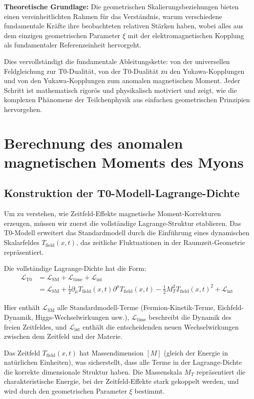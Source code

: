 \documentclass[12pt,a4paper]{article}
\newcommand{\Tfield}{T_{\text{field}}(x,t)}
\newcommand{\xigeom}{\xi}
\begin{document}
	\textbf{Theoretische Grundlage:} Die geometrischen Skalierungsbeziehungen bieten einen vereinheitlichten Rahmen für das Verständnis, warum verschiedene fundamentale Kräfte ihre beobachteten relativen Stärken haben, wobei alles aus dem einzigen geometrischen Parameter $\xigeom$ mit der elektromagnetischen Kopplung als fundamentaler Referenzeinheit hervorgeht.
	
	Dies vervollständigt die fundamentale Ableitungskette: von der universellen Feldgleichung zur T0-Dualität, von der T0-Dualität zu den Yukawa-Kopplungen und von den Yukawa-Kopplungen zum anomalen magnetischen Moment. Jeder Schritt ist mathematisch rigorös und physikalisch motiviert und zeigt, wie die komplexen Phänomene der Teilchenphysik aus einfachen geometrischen Prinzipien hervorgehen.
	
	\section{Berechnung des anomalen magnetischen Moments des Myons}
	
	\subsection{Konstruktion der T0-Modell-Lagrange-Dichte}
	
	Um zu verstehen, wie Zeitfeld-Effekte magnetische Moment-Korrekturen erzeugen, müssen wir zuerst die vollständige Lagrange-Struktur etablieren. Das T0-Modell erweitert das Standardmodell durch die Einführung eines dynamischen Skalarfeldes $\Tfield$, das zeitliche Fluktuationen in der Raumzeit-Geometrie repräsentiert.
	
	Die vollständige Lagrange-Dichte hat die Form:
	\begin{align}
		\mathcal{L}_{\text{T0}} &= \mathcal{L}_{\text{SM}} + \mathcal{L}_{\text{time}} + \mathcal{L}_{\text{int}} \\
		&= \mathcal{L}_{\text{SM}} + \frac{1}{2}\partial_\mu \Tfield \partial^\mu \Tfield - \frac{1}{2}M_T^2 \Tfield^2 + \mathcal{L}_{\text{int}}
	\end{align}
	
	Hier enthält $\mathcal{L}_{\text{SM}}$ alle Standardmodell-Terme (Fermion-Kinetik-Terme, Eichfeld-Dynamik, Higgs-Wechselwirkungen usw.), $\mathcal{L}_{\text{time}}$ beschreibt die Dynamik des freien Zeitfeldes, und $\mathcal{L}_{\text{int}}$ enthält die entscheidenden neuen Wechselwirkungen zwischen dem Zeitfeld und der Materie.
	
	Das Zeitfeld $\Tfield$ hat Massendimension $[M]$ (gleich der Energie in natürlichen Einheiten), was sicherstellt, dass alle Terme in der Lagrange-Dichte die korrekte dimensionale Struktur haben. Die Massenskala $M_T$ repräsentiert die charakteristische Energie, bei der Zeitfeld-Effekte stark gekoppelt werden, und wird durch den geometrischen Parameter $\xigeom$ bestimmt.
	
\end{document}
